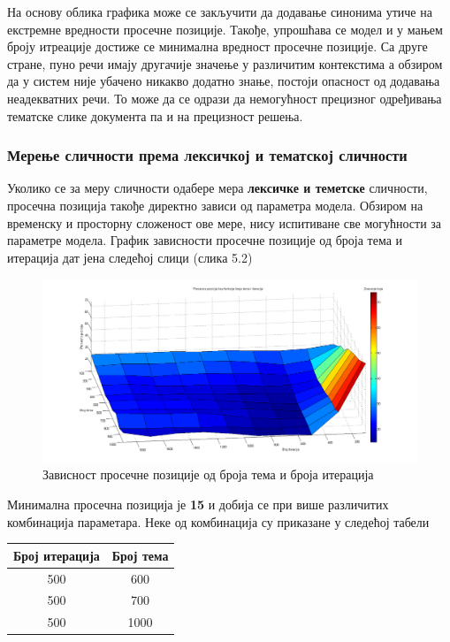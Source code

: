 На основу облика графика може се закључити да додавање синонима утиче на екстремне вредности просечне позиције. Такође, упрошћава се модел и у мањем броју итреације достиже се минимална вредност просечне позиције. 
Са друге стране, пуно речи имају другачије значење у различитим контекстима а обзиром да у систем није убачено никакво додатно знање, постоји опасност од додавања неадекватних речи. То може да се одрази да немогућност прецизног одређивања тематске слике документа па и на прецизност решења.




\subsubsection{Мерење сличности према лексичкој и тематској сличности}
	
Уколико се за меру сличности одабере мера  \textbf{лексичке и теметске} сличности, просечна позиција такође директно зависи од параметра модела. Обзиром на временску и просторну сложеност ове мере, нису испитиване све могућности за параметре модела. График зависности просечне позиције од броја тема и итерација дат јена следећој слици (слика 5.2)

		\begin{figure}[H]
    \centering
   \includegraphics[scale=0.3]{./Slike/distNoStemSyn.png} 
	\caption{Зависност просечне позиције од броја тема и броја итерација}
	\label{fig:slika1}
\end{figure}

Минимална просечна позиција је \textbf{15} и добија се при више различитих комбинација параметара. Неке од комбинација су приказане у следећој табели

\begin{center}
\begin{tabular}{|c|c|}
\hline
Број итерација & Број тема \\
\hline\hline
500 & 600 \\
500 & 700 \\
500 & 1000 \\
\hline
\end{tabular}

\end{center}





